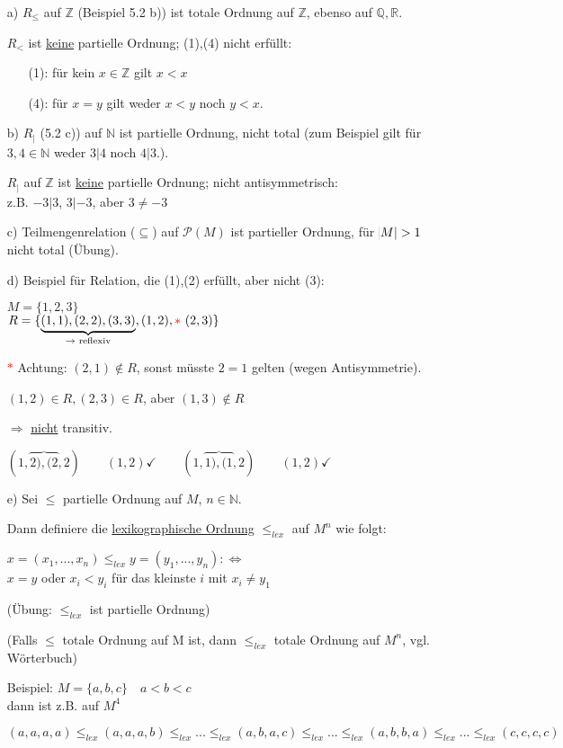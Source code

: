 \documentclass[a4paper, 12pt, twoside] {article}
\let\overfence\overbrace %
\begin{document}
\begin{itemize}
\item[a)]
$R_\leq$ auf $\mathbb{Z}$ (Beispiel 5.2 b)) ist totale Ordnung auf $\mathbb{Z}$, ebenso auf $\mathbb{Q},\mathbb{R}$.

$R_<$ ist \underline{keine} partielle Ordnung; (1),(4) nicht erfüllt:
	
	\begin{itemize}
	\item[(1):] für kein $x \in \mathbb{Z}$ gilt $x < x$
	\item[(4):] für $x=y$ gilt weder $x<y$ noch $y<x$.
	\end{itemize}
	
\item[b)]
$R_|$ (5.2 c)) auf $\mathbb{N}$ ist partielle Ordnung, nicht total (zum Beispiel gilt für $3,4 \in \mathbb{N}$ weder $3|4$ noch $4|3$.).

$R_|$ auf $\mathbb{Z}$ ist \underline{keine} partielle Ordnung; nicht antisymmetrisch: \\
z.B. $-3|3$, $3|-3$, aber $3 \neq -3$

\item[c)] Teilmengenrelation ($\subseteq$) auf $\mathcal{P}(M)$ ist partieller Ordnung, für $\abs{M} > 1 $ nicht total (Übung).

\item[d)] Beispiel für Relation, die (1),(2) erfüllt, aber nicht (3):

$M=\{1,2,3\}$\\
$R = \{\underbrace{(1,1),(2,2),(3,3)}_{\text{$\rightarrow$ reflexiv}},(1,2), \textcolor{red}{*} \text{ } (2,3)\}$

\textcolor{red}{$*$} Achtung: $(2,1) \notin R$, sonst müsste $2=1$ gelten (wegen Antisymmetrie).

$(1,2) \in R, (2,3) \in R$, aber $(1,3) \notin R$

$\Rightarrow$ \underline{nicht} transitiv.

$(1,\overfence{2),(2},2) \qquad (1,2) \checkmark \qquad (1,\overfence{1),(1},2) \qquad (1,2)\checkmark$

\item[e)] Sei $\leq$ partielle Ordnung auf $M$, $n \in \mathbb{N}$.

Dann definiere die \underline{lexikographische Ordnung} $\leq_{lex}$ auf $M^n$ wie folgt:

$x = (x_1,...,x_n) \leq_{lex} y = (y_1,...,y_n) :\Leftrightarrow$ \\
$x = y$ oder $x_i < y_i$ für das kleinste $i$ mit $x_i \neq y_1$

(Übung: $\leq_{lex}$ ist partielle Ordnung)

(Falls $\leq$ totale Ordnung auf M ist, dann $\leq_{lex}$ totale Ordnung auf $M^n$, vgl. Wörterbuch)

Beispiel: $M=\{a,b,c\} \quad a < b < c$ \\
dann ist z.B. auf $M^4$

$(a,a,a,a) \leq_{lex} (a,a,a,b) \leq_{lex} ... \leq_{lex} (a,b,a,c) \leq_{lex} ... \leq_{lex} (a,b,b,a) \leq_{lex} ... \leq_{lex} (c,c,c,c)$
	
\end{itemize}
\end{document}
